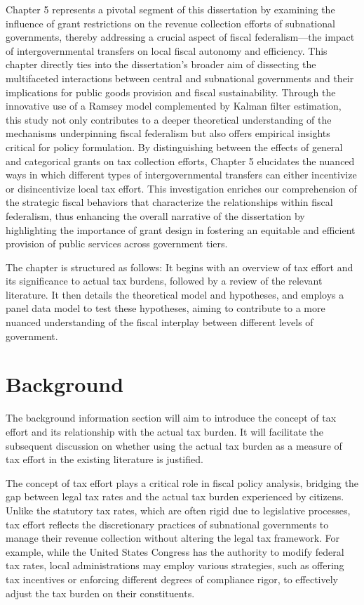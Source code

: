 Chapter 5 represents a pivotal segment of this dissertation by examining the influence of grant restrictions on the revenue collection efforts of subnational governments, thereby addressing a crucial aspect of fiscal federalism—the impact of intergovernmental transfers on local fiscal autonomy and efficiency. This chapter directly ties into the dissertation's broader aim of dissecting the multifaceted interactions between central and subnational governments and their implications for public goods provision and fiscal sustainability. Through the innovative use of a Ramsey model complemented by Kalman filter estimation, this study not only contributes to a deeper theoretical understanding of the mechanisms underpinning fiscal federalism but also offers empirical insights critical for policy formulation. By distinguishing between the effects of general and categorical grants on tax collection efforts, Chapter 5 elucidates the nuanced ways in which different types of intergovernmental transfers can either incentivize or disincentivize local tax effort. This investigation enriches our comprehension of the strategic fiscal behaviors that characterize the relationships within fiscal federalism, thus enhancing the overall narrative of the dissertation by highlighting the importance of grant design in fostering an equitable and efficient provision of public services across government tiers.

The chapter is structured as follows: It begins with an overview of tax effort and its significance to actual tax burdens, followed by a review of the relevant literature. It then details the theoretical model and hypotheses, and employs a panel data model to test these hypotheses, aiming to contribute to a more nuanced understanding of the fiscal interplay between different levels of government.

\section{Background}

The background information section will aim to introduce the concept of tax effort and its relationship with the actual tax burden. It will facilitate the subsequent discussion on whether using the actual tax burden as a measure of tax effort in the existing literature is justified.

The concept of tax effort plays a critical role in fiscal policy analysis, bridging the gap between legal tax rates and the actual tax burden experienced by citizens. Unlike the statutory tax rates, which are often rigid due to legislative processes, tax effort reflects the discretionary practices of subnational governments to manage their revenue collection without altering the legal tax framework. For example, while the United States Congress has the authority to modify federal tax rates, local administrations may employ various strategies, such as offering tax incentives or enforcing different degrees of compliance rigor, to effectively adjust the tax burden on their constituents.

